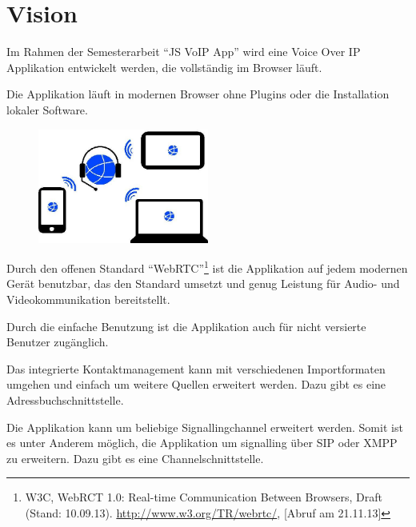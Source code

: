   \chapter{Vision}
	Im Rahmen der Semesterarbeit ``JS VoIP App'' wird eine Voice Over IP Applikation entwickelt werden, die vollständig im Browser läuft.
	
	Die Applikation läuft in modernen Browser ohne Plugins oder die Installation lokaler Software.
			
	\begin{figure}[H]
		\centering
		\includegraphics[width=0.5\textwidth]{img/plattformUnabhaengigkeit.jpg}
		\label{plattformUnabhaengigkeit}
	\end{figure}
	
	Durch den offenen Standard ``WebRTC''\footnote{W3C, WebRCT 1.0: Real-time Communication Between Browsers, Draft (Stand: 10.09.13). \hyperlink{http://www.w3.org/TR/webrtc/}{http://www.w3.org/TR/webrtc/}, [Abruf am 21.11.13]}
	 ist die Applikation auf jedem modernen Gerät benutzbar, das den Standard umsetzt und genug Leistung für Audio- und Videokommunikation bereitstellt.
	
	Durch die einfache Benutzung ist die Applikation auch für nicht versierte Benutzer zugänglich.
	
	Das integrierte Kontaktmanagement kann mit verschiedenen Importformaten umgehen und einfach um weitere Quellen erweitert werden. Dazu gibt es eine Adressbuchschnittstelle.
	
	Die Applikation kann um beliebige Signallingchannel erweitert werden. Somit ist es unter Anderem möglich, die Applikation um signalling über SIP oder XMPP zu erweitern. Dazu gibt es eine Channelschnittstelle.
	
		